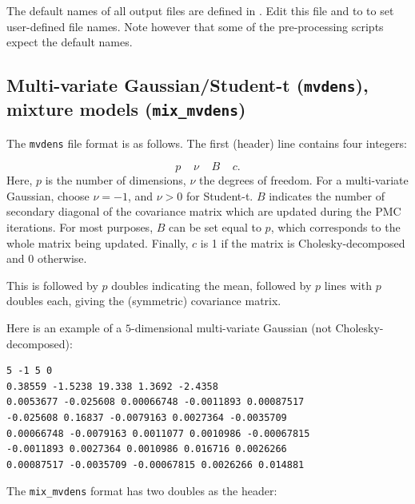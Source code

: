 \documentclass[11pt, chapterprefix, headsepline]{scrartcl}
\begin{document}
\begin{appendix}
The default names of all output files are defined in
. Edit this file and to  to
set user-defined file names. Note however that some of the
pre-processing scripts expect the default names.



\subsection{Multi-variate Gaussian/Student-t (\texttt{mvdens}),
  mixture models (\texttt{mix\_mvdens})}
\label{sec:mvdens}

The \texttt{mvdens} file format is as follows. The first (header) line
contains four integers:

$$
   p \;\;\;\; \nu \;\;\;\; B \;\;\;\; c.
$$
%
Here, $p$ is the number of dimensions, $\nu$ the
degrees of freedom. For a multi-variate Gaussian, choose
$\nu=-1$, and $\nu>0$ for Student-t. $B$
indicates the number of secondary diagonal of the covariance matrix
which are updated during the PMC iterations. For most purposes,
$B$ can be set equal to $p$, which
corresponds to the whole matrix being updated. Finally, $c$
is 1 if the matrix is Cholesky-decomposed and 0 otherwise.

This is followed by $p$ doubles indicating the mean,
followed by $p$ lines with $p$ doubles each,
giving the (symmetric) covariance matrix.

Here is an example of a $5$-dimensional multi-variate Gaussian (not Cholesky-decomposed):

\begin{verbatim}
5 -1 5 0
0.38559 -1.5238 19.338 1.3692 -2.4358 
0.0053677 -0.025608 0.00066748 -0.0011893 0.00087517 
-0.025608 0.16837 -0.0079163 0.0027364 -0.0035709 
0.00066748 -0.0079163 0.0011077 0.0010986 -0.00067815 
-0.0011893 0.0027364 0.0010986 0.016716 0.0026266 
0.00087517 -0.0035709 -0.00067815 0.0026266 0.014881 
\end{verbatim}

The \texttt{mix\_mvdens} format has two doubles as the header:


\end{appendix}
\end{document}
